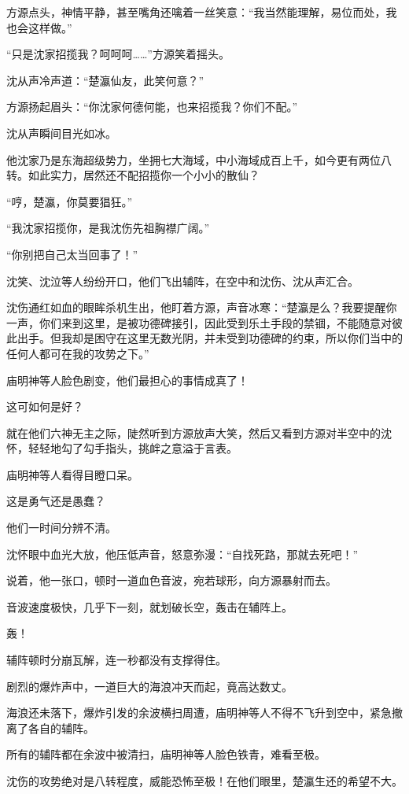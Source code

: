 \begin{this_body}
方源点头，神情平静，甚至嘴角还噙着一丝笑意：“我当然能理解，易位而处，我也会这样做。”

“只是沈家招揽我？呵呵呵……”方源笑着摇头。

沈从声冷声道：“楚瀛仙友，此笑何意？”

方源扬起眉头：“你沈家何德何能，也来招揽我？你们不配。”

沈从声瞬间目光如冰。

他沈家乃是东海超级势力，坐拥七大海域，中小海域成百上千，如今更有两位八转。如此实力，居然还不配招揽你一个小小的散仙？

“哼，楚瀛，你莫要猖狂。”

“我沈家招揽你，是我沈伤先祖胸襟广阔。”

“你别把自己太当回事了！”

沈笑、沈泣等人纷纷开口，他们飞出辅阵，在空中和沈伤、沈从声汇合。

沈伤通红如血的眼眸杀机生出，他盯着方源，声音冰寒：“楚瀛是么？我要提醒你一声，你们来到这里，是被功德碑接引，因此受到乐土手段的禁锢，不能随意对彼此出手。但我却是困守在这里无数光阴，并未受到功德碑的约束，所以你们当中的任何人都可在我的攻势之下。”

庙明神等人脸色剧变，他们最担心的事情成真了！

这可如何是好？

就在他们六神无主之际，陡然听到方源放声大笑，然后又看到方源对半空中的沈怀，轻轻地勾了勾手指头，挑衅之意溢于言表。

庙明神等人看得目瞪口呆。

这是勇气还是愚蠢？

他们一时间分辨不清。

沈怀眼中血光大放，他压低声音，怒意弥漫：“自找死路，那就去死吧！”

说着，他一张口，顿时一道血色音波，宛若球形，向方源暴射而去。

音波速度极快，几乎下一刻，就划破长空，轰击在辅阵上。

轰！

辅阵顿时分崩瓦解，连一秒都没有支撑得住。

剧烈的爆炸声中，一道巨大的海浪冲天而起，竟高达数丈。

海浪还未落下，爆炸引发的余波横扫周遭，庙明神等人不得不飞升到空中，紧急撤离了各自的辅阵。

所有的辅阵都在余波中被清扫，庙明神等人脸色铁青，难看至极。

沈伤的攻势绝对是八转程度，威能恐怖至极！在他们眼里，楚瀛生还的希望不大。


\end{this_body}
